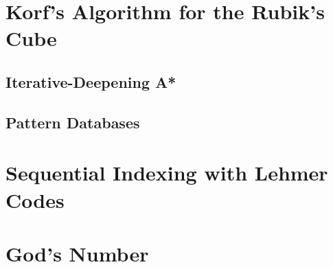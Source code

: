 
\section{Korf's Algorithm for the Rubik's Cube}
\subsection{Iterative-Deepening A*}
\subsection{Pattern Databases}

\section{Sequential Indexing with Lehmer Codes}

\section{God's Number}